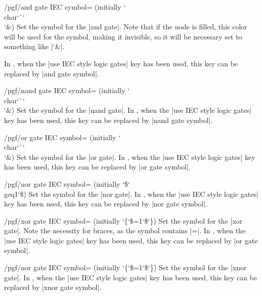 \begin{key}{/pgf/and gate IEC symbol= (initially \char`\\char\char`\`\char`\\\char`\&)}
  Set the symbol for the |and gate|. Note that if the node is filled,
  this color will be used for the symbol, making it invisible, so
  it will be necessary set  to something like
  |\color{black}\char`\&|.
  
  In \tikzname, when the |use IEC style logic gates| key has been 
  used, this key can be replaced by |and gate symbol|.
\end{key}

\begin{key}{/pgf/nand gate IEC symbol= (initially \char`\\char\char`\`\char`\\\char`\&)}
  Set the symbol for the |nand gate|.  
  In \tikzname, when the |use IEC style logic gates| key has been 
  used, this key can be replaced by |nand gate symbol|.
\end{key}

\begin{key}{/pgf/or gate IEC symbol= (initially \char`\\char\char`\`\char`\\\char`\&)}
  Set the symbol for the |or gate|.  
  In \tikzname, when the |use IEC style logic gates| key has been 
  used, this key can be replaced by |or gate symbol|.
\end{key}

\begin{key}{/pgf/nor gate IEC symbol= (initially \char`\$\char`\\geq1\char`\$)}
  Set the symbol for the |nor gate|.  
  In \tikzname, when the |use IEC style logic gates| key has been 
  used, this key can be replaced by |nor gate symbol|.
\end{key}

\begin{key}{/pgf/xor gate IEC symbol= (initially \char`\{\char`\$=1\char`\$\char`\})}
  Set the symbol for the |xor gate|. Note the necessity for braces,
  as the symbol contains |=|.
  In \tikzname, when the |use IEC style logic gates| key has been 
  used, this key can be replaced by |or gate symbol|.
\end{key}

\begin{key}{/pgf/nor gate IEC symbol= (initially  \char`\{\char`\$=1\char`\$\char`\})}
  Set the symbol for the |xnor gate|.  
  In \tikzname, when the |use IEC style logic gates| key has been 
  used, this key can be replaced by |xnor gate symbol|.
\end{key}

